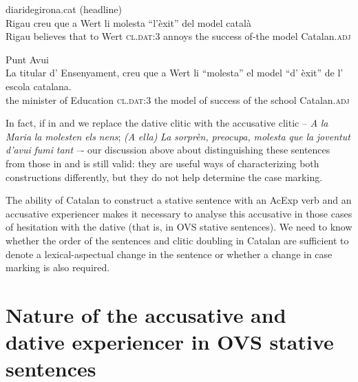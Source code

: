 \documentclass[output=paper,modfonts,nonflat,newtxmath]{langsci/langscibook}
\begin{document}
 \ex diaridegirona.cat (headline)\\
 \gll Rigau creu que a Wert li molesta “l’èxit” del model català\\
 Rigau believes that to Wert \textsc{cl.dat:3} annoys the success of-the model Catalan.\textsc{adj} \\
 \glt
 
  {Punt} {Avui}\\
 \gll La titular d’ Ensenyament, creu que a Wert li “molesta” el model “d’ èxit” de l’ escola catalana.\\
 the minister of Education \textsc{cl.dat:3} the model of success of the school Catalan.\textsc{adj}\\
 \glt
 
 \z
 \z


In fact, if in  and  we replace the dative clitic with the accusative clitic – \textit{A} \textit{la} \textit{Maria} \textit{la} \textit{molesten} \textit{els} \textit{nens}; \textit{(A} \textit{ella)} \textit{La} \textit{sorprèn,} \textit{preocupa,} \textit{molesta} \textit{que} \textit{la} \textit{joventut} \textit{d’avui} \textit{fumi} \textit{tant} –- our discussion above about distinguishing these sentences from those in  and  is still valid: they are useful ways of characterizing both constructions differently, but they do not help determine the case marking.

The ability of Catalan to construct a stative sentence with an AcExp verb and an accusative experiencer makes it necessary to analyse this accusative in those cases of hesitation with the dative (that is, in OVS stative sentences). We need to know whether the order of the sentences and clitic doubling in Catalan are sufficient to denote a lexical-aspectual change in the sentence or whether a change in case marking is also required.


\section{Nature of the accusative and dative experiencer in OVS stative sentences}%
\label{sec:royo:3}
\end{document}
